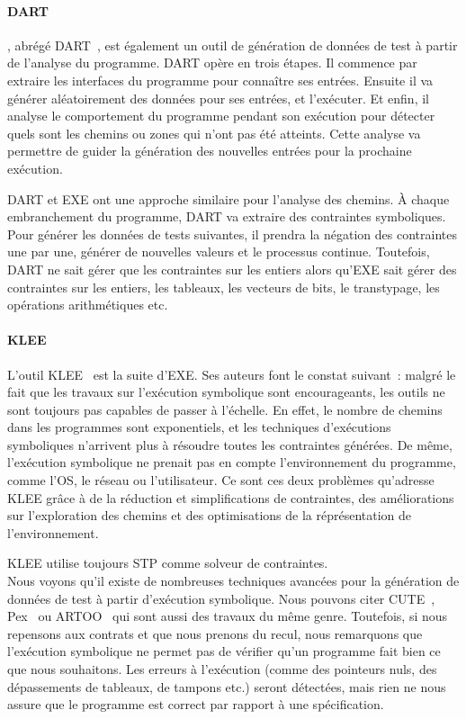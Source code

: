 \paragraph{DART} , abrégé
DART~, est également un outil de génération de données de
test à partir de l'analyse du programme. DART opère en trois étapes. Il commence
par extraire les interfaces du programme pour connaître ses entrées. Ensuite il
va générer aléatoirement des données pour ses entrées, et l'exécuter. Et enfin,
il analyse le comportement du programme pendant son exécution pour détecter
quels sont les chemins ou zones qui n'ont pas été atteints. Cette analyse va
permettre de guider la génération des nouvelles entrées pour la prochaine
exécution.

DART et EXE ont une approche similaire pour l'analyse des chemins. À chaque
embranchement du programme, DART va extraire des contraintes symboliques. Pour
générer les données de tests suivantes, il prendra la négation des contraintes
une par une, générer de nouvelles valeurs et le processus continue. Toutefois,
DART ne sait gérer que les contraintes sur les entiers alors qu'EXE sait gérer
des contraintes sur les entiers, les tableaux, les vecteurs de bits, le
transtypage, les opérations arithmétiques etc.

\paragraph{KLEE} L'outil KLEE~ est la suite d'EXE. Ses auteurs
font le constat suivant~: malgré le fait que les travaux sur l'exécution
symbolique sont encourageants, les outils ne sont toujours pas capables de
passer à l'échelle. En effet, le nombre de chemins dans les programmes sont
exponentiels, et les techniques d'exécutions symboliques n'arrivent plus à
résoudre toutes les contraintes générées. De même, l'exécution symbolique ne
prenait pas en compte l'environnement du programme, comme l'OS, le réseau ou
l'utilisateur. Ce sont ces deux problèmes qu'adresse KLEE grâce à de la
réduction et simplifications de contraintes, des améliorations sur l'exploration
des chemins et des optimisations de la réprésentation de l'environnement.

KLEE utilise toujours STP comme solveur de contraintes. \\

Nous voyons qu'il existe de nombreuses techniques avancées pour la génération de
données de test à partir d'exécution symbolique. Nous pouvons citer
CUTE~, Pex~ ou ARTOO~ qui
sont aussi des travaux du même genre. Toutefois, si nous repensons aux contrats
et que nous prenons du recul, nous remarquons que l'exécution symbolique ne
permet pas de vérifier qu'un programme fait bien ce que nous souhaitons. Les
erreurs à l'exécution (comme des pointeurs nuls, des dépassements de tableaux,
de tampons etc.) seront détectées, mais rien ne nous assure que le programme est
correct par rapport à une spécification.

